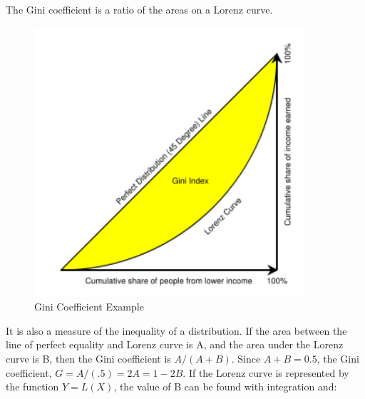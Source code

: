 \documentclass{howto}
\begin{document}
The Gini coefficient is a ratio of the areas on a Lorenz curve. 

\begin{figure}
\begin{center}
\includegraphics[width=100mm]{images/gini.pdf}
\caption{Gini Coefficient Example}
\end{center}
\end{figure}

It is also a measure of the inequality of a distribution.  If the area between the line of 
perfect equality and Lorenz curve is A, and the area under the Lorenz curve is B, then the 
Gini coefficient is $A/(A+B)$. Since $A+B = 0.5$, the Gini coefficient, $G = A/(.5) = 2A = 1-2B$. 
If the Lorenz curve is represented by the function $Y = L(X)$, the value of B can be found with integration and:
\end{document}
